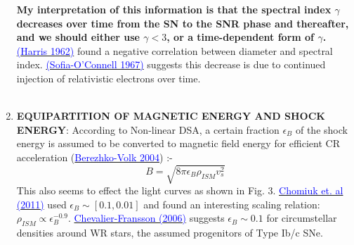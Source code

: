 \documentclass[10pt,a4paper]{article}
\begin{document}
\begin{enumerate}
\textbf{My interpretation of this information is that the spectral index $\gamma$ decreases over time from the SN to the SNR phase and thereafter, and we should either use $\gamma < 3$, or a time-dependent form of $\gamma$.} \href{http://adsabs.harvard.edu/abs/1962ApJ...135..661H}{\textcolor{blue}{(Harris 1962)}} found a negative correlation between diameter and spectral index. \href{http://adsabs.harvard.edu/abs/1967ZA.....65..498S}{\textcolor{blue}{(Sofia-O'Connell 1967)}} suggests this decrease is due to continued injection of relativistic electrons over time.\\\\
\item \textbf{EQUIPARTITION OF MAGNETIC ENERGY AND SHOCK ENERGY}:  According to Non-linear DSA, a certain fraction $\epsilon_B$ of the shock energy is assumed to be converted to magnetic field energy for efficient CR acceleration (\href{http://arxiv.org/abs/astro-ph/0408121}{\textcolor{blue}{Berezhko-Volk 2004}}) :-
\begin{equation}
B = \sqrt{8 \pi \epsilon_B \rho_{ISM} v_s^2}
\end{equation}
This also seems to effect the light curves as shown in Fig. 3. \href{http://adsabs.harvard.edu/abs/2012ApJ...750..164C}{\textcolor{blue}{Chomiuk et. al (2011)}} used $\epsilon_B \sim [0.1,0.01]$ and found an interesting scaling relation: $\rho_{ISM} \propto \epsilon_B^{-0.9}$. \href{http://adsabs.harvard.edu/abs/2006ApJ...651..381C}{\textcolor{blue}{Chevalier-Fransson (2006)}} suggests $\epsilon_B \sim 0.1$ for circumstellar densities around WR stars, the assumed progenitors of Type Ib/c SNe.
\end{enumerate}
\newpage
\end{document}
